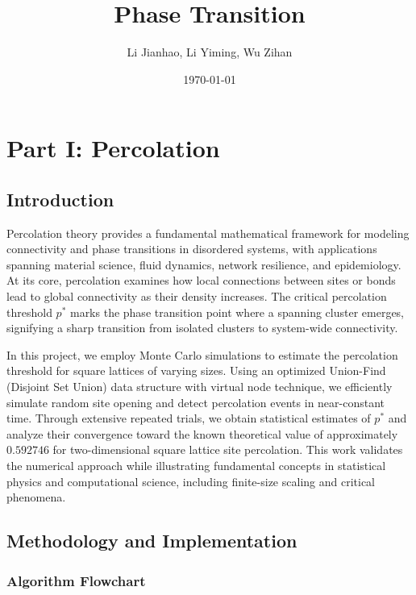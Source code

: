 \documentclass[11pt]{article}
\title{Phase Transition}
\author{Li Jianhao, Li Yiming, Wu Zihan}
\date{\today}
\begin{document}
    
    \maketitle
    
    \tableofcontents

    
    \section{Part I: Percolation}\label{part-i-percolation}

\subsection{Introduction}\label{introduction}

Percolation theory provides a fundamental mathematical framework for
modeling connectivity and phase transitions in disordered systems, with
applications spanning material science, fluid dynamics, network
resilience, and epidemiology. At its core, percolation examines how
local connections between sites or bonds lead to global connectivity as
their density increases. The critical percolation threshold \(p^*\)
marks the phase transition point where a spanning cluster emerges,
signifying a sharp transition from isolated clusters to system-wide
connectivity.

In this project, we employ Monte Carlo simulations to estimate the
percolation threshold for square lattices of varying sizes. Using an
optimized Union-Find (Disjoint Set Union) data structure with virtual
node technique, we efficiently simulate random site opening and detect
percolation events in near-constant time. Through extensive repeated
trials, we obtain statistical estimates of \(p^*\) and analyze their
convergence toward the known theoretical value of approximately
\(0.592746\) for two-dimensional square lattice site percolation. This
work validates the numerical approach while illustrating fundamental
concepts in statistical physics and computational science, including
finite-size scaling and critical phenomena.

    \subsection{Methodology and
Implementation}\label{methodology-and-implementation}

    \subsubsection{Algorithm Flowchart}\label{algorithm-flowchart}
\end{document}

